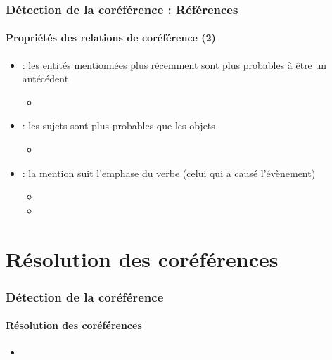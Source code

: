 \documentclass[xcolor=table]{beamer}
\begin{document}
\begin{frame}
	\frametitle{Détection de la coréférence : Références}
	\framesubtitle{Propriétés des relations de coréférence (2)}
	
	\begin{itemize}
		
		\item {} : les entités mentionnées plus récemment sont plus probables à être un antécédent
		\begin{itemize}
			\item {}
		\end{itemize}
		
		\item {} : les sujets sont plus probables que les objets
		\begin{itemize}
			\item {}
		\end{itemize}
		
		\item {} : la mention suit l'emphase du verbe (celui qui a causé l'évènement)
		\begin{itemize}
			\item {}
			\item {}
		\end{itemize}
	\end{itemize}
	
\end{frame}

\section{Résolution des coréférences}

\begin{frame}
	\frametitle{Détection de la coréférence}
	\framesubtitle{Résolution des coréférences}
	
	\begin{itemize}
		\item 
	\end{itemize}
	
\end{frame}
\end{document}
